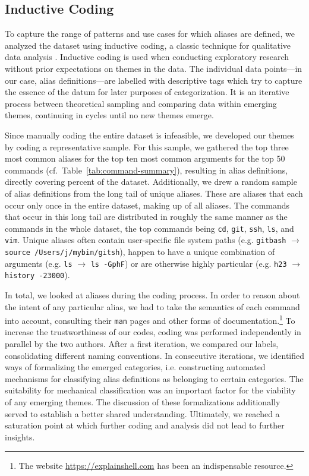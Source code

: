 \documentclass[sigconf,nonacm,screen]{acmart}
\newcommand{\num}[1]{\numprint{#1}}
\newcommand{\per}[1]{\numprint[\%]{#1}}
\newcommand{\alias}[2]{{\texttt{#1} $\rightarrow$ \texttt{#2}}}
\newcommand{\cmd}[1]{{\texttt{#1}}}
\begin{document}
\subsection{Inductive Coding}

To capture the range of patterns and use cases for which aliases are defined, we analyzed the dataset using inductive coding, a classic technique for qualitative data analysis \citep{saldana:16,thomas:06,dey:03}.
Inductive coding is used when conducting exploratory research without prior expectations on themes in the data.
The individual data points---in our case, alias definitions---are labelled with descriptive tags which try to capture the essence of the datum for later purposes of categorization.
It is an iterative process between theoretical sampling and comparing data within emerging themes, continuing in cycles until no new themes emerge.

Since manually coding the entire dataset is infeasible, we developed our themes by coding a representative sample.
For this sample, we gathered the top three most common aliases for the top ten most common arguments for the top 50 commands (cf.\ Table~\ref{tab:command-summary}), resulting in \num{1381} alias definitions, directly covering \per{28.77} percent of the dataset.
Additionally, we drew a random sample of \num{200} alias definitions from the long tail of unique aliases.
These are aliases that each occur only once in the entire dataset, making up \per{27.53} of all aliases.
The commands that occur in this long tail are distributed in roughly the same manner as the commands in the whole dataset, the top commands being \cmd{cd}, \cmd{git}, \cmd{ssh}, \cmd{ls}, and \cmd{vim}.
Unique aliases often contain user-specific file system paths (e.g. \alias{gitbash}{source /Users/j/mybin/gitsh}), happen to have a unique combination of arguments (e.g. \alias{ls}{ls -GphF}) or are otherwise highly particular (e.g. \alias{h23}{history -23000}).

In total, we looked at \num{1581} aliases during the coding process.
In order to reason about the intent of any particular alias, we had to take the semantics of each command into account, consulting their \texttt{man} pages and other forms of documentation.\footnote{The website \url{https://explainshell.com} has been an indispensable resource.}
To increase the trustworthiness of our codes, coding was performed independently in parallel by the two authors.
After a first iteration, we compared our labels, consolidating different naming conventions.
In consecutive iterations, we identified ways of formalizing the emerged categories, i.e. constructing automated mechanisms for classifying alias definitions as belonging to certain categories.
The suitability for mechanical classification was an important factor for the viability of any emerging themes.
The discussion of these formalizations additionally served to establish a better shared understanding.
Ultimately, we reached a saturation point at which further coding and analysis did not lead to further insights.
\end{document}

